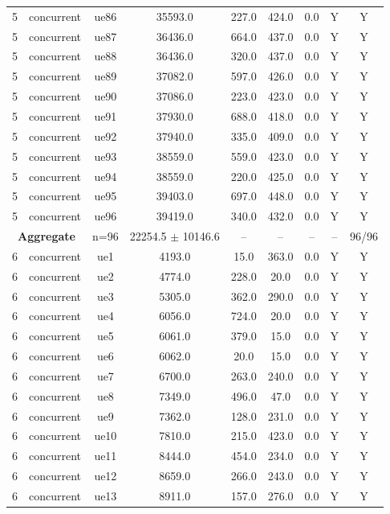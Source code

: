 \begin{table}[ht]
\begin{tabular}{|c|c|c|c|c|c|c|c|c|}
5 & concurrent & ue86 & 35593.0 & 227.0 & 424.0 & 0.0 & Y & Y \\
5 & concurrent & ue87 & 36436.0 & 664.0 & 437.0 & 0.0 & Y & Y \\
5 & concurrent & ue88 & 36436.0 & 320.0 & 437.0 & 0.0 & Y & Y \\
5 & concurrent & ue89 & 37082.0 & 597.0 & 426.0 & 0.0 & Y & Y \\
5 & concurrent & ue90 & 37086.0 & 223.0 & 423.0 & 0.0 & Y & Y \\
5 & concurrent & ue91 & 37930.0 & 688.0 & 418.0 & 0.0 & Y & Y \\
5 & concurrent & ue92 & 37940.0 & 335.0 & 409.0 & 0.0 & Y & Y \\
5 & concurrent & ue93 & 38559.0 & 559.0 & 423.0 & 0.0 & Y & Y \\
5 & concurrent & ue94 & 38559.0 & 220.0 & 425.0 & 0.0 & Y & Y \\
5 & concurrent & ue95 & 39403.0 & 697.0 & 448.0 & 0.0 & Y & Y \\
5 & concurrent & ue96 & 39419.0 & 340.0 & 432.0 & 0.0 & Y & Y \\
\multicolumn{2}{|c|}{\textbf{Aggregate}} & n=96 & 22254.5 $\pm$ 10146.6 & -- & -- & -- & -- & 96/96 \\
\hline
6 & concurrent & ue1 & 4193.0 & 15.0 & 363.0 & 0.0 & Y & Y \\
6 & concurrent & ue2 & 4774.0 & 228.0 & 20.0 & 0.0 & Y & Y \\
6 & concurrent & ue3 & 5305.0 & 362.0 & 290.0 & 0.0 & Y & Y \\
6 & concurrent & ue4 & 6056.0 & 724.0 & 20.0 & 0.0 & Y & Y \\
6 & concurrent & ue5 & 6061.0 & 379.0 & 15.0 & 0.0 & Y & Y \\
6 & concurrent & ue6 & 6062.0 & 20.0 & 15.0 & 0.0 & Y & Y \\
6 & concurrent & ue7 & 6700.0 & 263.0 & 240.0 & 0.0 & Y & Y \\
6 & concurrent & ue8 & 7349.0 & 496.0 & 47.0 & 0.0 & Y & Y \\
6 & concurrent & ue9 & 7362.0 & 128.0 & 231.0 & 0.0 & Y & Y \\
6 & concurrent & ue10 & 7810.0 & 215.0 & 423.0 & 0.0 & Y & Y \\
6 & concurrent & ue11 & 8444.0 & 454.0 & 234.0 & 0.0 & Y & Y \\
6 & concurrent & ue12 & 8659.0 & 266.0 & 243.0 & 0.0 & Y & Y \\
6 & concurrent & ue13 & 8911.0 & 157.0 & 276.0 & 0.0 & Y & Y \\

\end{tabular}
\end{table}
